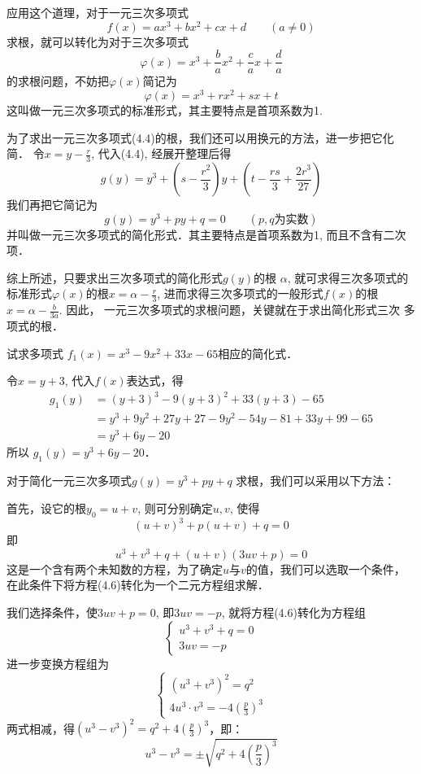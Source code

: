 应用这个道理，对于一元三次多项式
\begin{equation}
    f (x) =ax^3+bx^2+cx+d\qquad  (a\ne 0)
\end{equation}
求根，就可以转化为对于三次多项式
\[\varphi(x)=x^3+\frac{b}{a}x^2+\frac{c}{a}x+\frac{d}{a}\]
的求根问题，不妨把$\varphi(x)$简记为
\begin{equation}
    \varphi(x)=x^3+rx^2+sx+t
\end{equation}
这叫做一元三次多项式的标准形式，其主要特点是首项系数为1.

为了求出一元三次多项式(4.4)的根，我们还可以用换元的方法，进一步把它化简．
令$x=y-\frac{r}{3}$, 代入(4.4), 经展开整理后得
\[g(y) =y^3+ \left(s-\frac{r^2}{3}\right) y+ \left(t-\frac{rs}{3}+\frac{2r^3}{27}\right)\]
我们再把它简记为
\begin{equation}
    g(y)=y^3+py+q=0\qquad  (p,q\text{为实数})
\end{equation}
并叫做一元三次多项式的简化形式．其主要特点是首项系数为1, 而且不含有二次项．

综上所述，只要求出三次多项式的简化形式$g(y)$的根
$\alpha$, 就可求得三次多项式的标准形式$\varphi(x)$的根$x=\alpha-\frac{r}{3}$,
进而求得三次多项式的一般形式$f(x)$的根$x=\alpha-\frac{b}{3a}$. 因此，
一元三次多项式的求根问题，关键就在于求出简化形式三次
多项式的根．

\begin{example}
    试求多项式
$f_1 (x) =x^3-9x^2+33x-65$相应的简化式．
\end{example}


\begin{solution}
    令$x=y+3$, 代入$f(x)$表达式，得
\[\begin{split}
    g_1 (y) &= (y+3)^3-9 (y+3)^2+33 (y+3) -65\\
&=y^3+9y^2+27y+27-9y^2-54y-81+33y+99-65\\
&=y^3 +6y -20
\end{split}\]
所以
$g_1 (y) =y^3+6y-20$．
\end{solution}

对于简化一元三次多项式$g(y)=y^3+py+q$
求根，我们可以采用以下方法：

首先，设它的根$y_0=u+v$, 则可分别确定$u,v$, 使得
\begin{equation}
     (u+v)^3+p (u+v) +q=0
\end{equation}
即
\[u^3+v^3+q+ (u+v) (3uv+p)=0\]
这是一个含有两个未知数的方程，为了确定$u$与$v$的值，我们可以选取一个条件，在此条件下将方程(4.6)转化为一个二元方程组求解．

我们选择条件，使$3uv+p=0$, 即$3uv=-p$, 就将方程(4.6)转化为方程组
\[\begin{cases}
    u^3+v^3+q=0\\3uv=-p
\end{cases}\]
进一步变换方程组为
\[\begin{cases}
    (u^3+v^3)^2=q^2\\
    4u^3\cdot v^3=-4\left(\frac{p}{3}\right)^3
\end{cases}\]
两式相减，得$(u^3-v^3)^2=q^2+4\left(\frac{p}{3}\right)^3$，即：
\[u^3-v^3=\pm\sqrt{q^2+4\left(\frac{p}{3}\right)^3}\]

